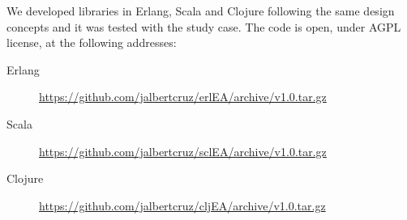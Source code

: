 
We developed libraries in Erlang, Scala and Clojure following the same design concepts and it was tested with the study case. The code is open, under AGPL license, at the following addresses:

\begin{description}
  \item[Erlang] \url{https://github.com/jalbertcruz/erlEA/archive/v1.0.tar.gz}
  \item[Scala] \url{https://github.com/jalbertcruz/sclEA/archive/v1.0.tar.gz}
  \item[Clojure] \url{https://github.com/jalbertcruz/cljEA/archive/v1.0.tar.gz}
\end{description}
